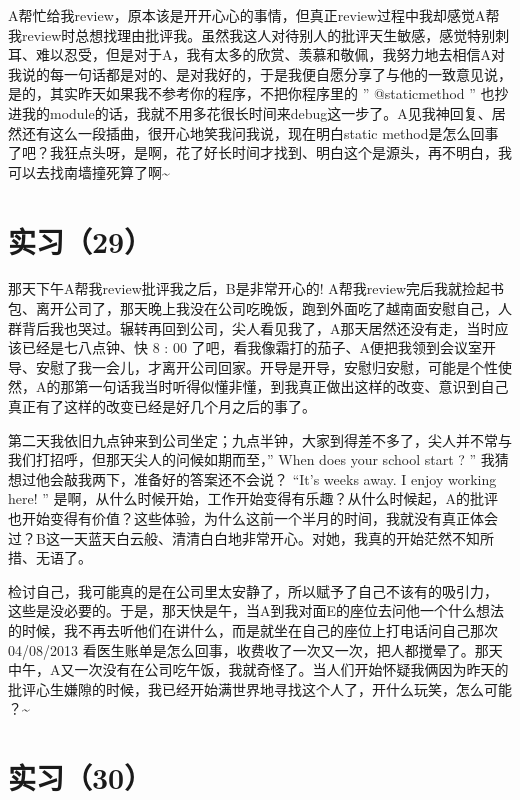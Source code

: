 \documentclass[12pt]{book}
\begin{document}
A帮忙给我review，原本该是开开心心的事情，但真正review过程中我却感觉A帮我review时总想找理由批评我。虽然我这人对待别人的批评天生敏感，感觉特别刺耳、难以忍受，但是对于A，我有太多的欣赏、羡慕和敬佩，我努力地去相信A对我说的每一句话都是对的、是对我好的，于是我便自愿分享了与他的一致意见说，是的，其实昨天如果我不参考你的程序，不把你程序里的 ” @staticmethod ” 也抄进我的module的话，我就不用多花很长时间来debug这一步了。A见我神回复、居然还有这么一段插曲，很开心地笑我问我说，现在明白static method是怎么回事了吧？我狂点头呀，是啊，花了好长时间才找到、明白这个是源头，再不明白，我可以去找南墙撞死算了啊\textasciitilde{}~

\section{实习（29）}
\label{sec-5-32}

那天下午A帮我review批评我之后，B是非常开心的!  A帮我review完后我就捡起书包、离开公司了，那天晚上我没在公司吃晚饭，跑到外面吃了越南面安慰自己，人群背后我也哭过。辗转再回到公司，尖人看见我了，A那天居然还没有走，当时应该已经是七八点钟、快 8 : 00 了吧，看我像霜打的茄子、A便把我领到会议室开导、安慰了我一会儿，才离开公司回家。开导是开导，安慰归安慰，可能是个性使然，A的那第一句话我当时听得似懂非懂，到我真正做出这样的改变、意识到自己真正有了这样的改变已经是好几个月之后的事了。

第二天我依旧九点钟来到公司坐定；九点半钟，大家到得差不多了，尖人并不常与我们打招呼，但那天尖人的问候如期而至，” When does your school start ? ” 我猜想过他会敲我两下，准备好的答案还不会说？ “It’s weeks away.  I enjoy working here! ” 是啊，从什么时候开始，工作开始变得有乐趣？从什么时候起，A的批评也开始变得有价值？这些体验，为什么这前一个半月的时间，我就没有真正体会过？B这一天蓝天白云般、清清白白地非常开心。对她，我真的开始茫然不知所措、无语了。

检讨自己，我可能真的是在公司里太安静了，所以赋予了自己不该有的吸引力， 这些是没必要的。于是，那天快是午，当A到我对面E的座位去问他一个什么想法的时候，我不再去听他们在讲什么，而是就坐在自己的座位上打电话问自己那次04/08/2013 看医生账单是怎么回事，收费收了一次又一次，把人都搅晕了。那天中午，A又一次没有在公司吃午饭，我就奇怪了。当人们开始怀疑我俩因为昨天的批评心生嫌隙的时候，我已经开始满世界地寻找这个人了，开什么玩笑，怎么可能 ？\textasciitilde{}~

\section{实习（30）}
\label{sec-5-33}
\end{document}
